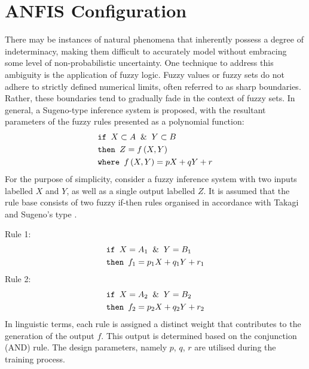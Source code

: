 \section{ANFIS Configuration}
There may be instances of natural phenomena that inherently possess a degree of indeterminacy, making them difficult to accurately model without embracing some level of non-probabilistic uncertainty. One technique to address this ambiguity is the application of fuzzy logic. Fuzzy values or fuzzy sets do not adhere to strictly defined numerical limits, often referred to as sharp boundaries. Rather, these boundaries tend to gradually fade in the context of fuzzy sets. In general, a Sugeno-type inference system is proposed, with the resultant parameters of the fuzzy rules presented as a polynomial function: 
\begin{align}
    &\texttt{if } X \subset A \And Y \subset B\\
    &\texttt{then } Z = f\left(X,Y\right)\\
    &\texttt{where } f\left(X,Y\right) = pX + qY + r
\end{align}
For the purpose of simplicity, consider a fuzzy inference system with two inputs labelled $X$ and $Y$, as well as a single output labelled $Z$. It is assumed that the rule base consists of two fuzzy if-then rules organised in accordance with Takagi and Sugeno's type \cite{TAKAGI198355}.

Rule 1:
\begin{align}
    &\texttt{if } X = A_1 \And Y = B_1\\
    &\texttt{then } f_1 = p_1X + q_1 Y + r_1
\end{align}
Rule 2:
\begin{align}
    &\texttt{if } X = A_2 \And Y = B_2\\
    &\texttt{then } f_2 = p_2X + q_2 Y + r_2
\end{align}
In linguistic terms, each rule is assigned a distinct weight that contributes to the generation of the output $f$. This output is determined based on the conjunction (AND) rule. The design parameters, namely $p$, $q$, $r$ are utilised during the training process.
